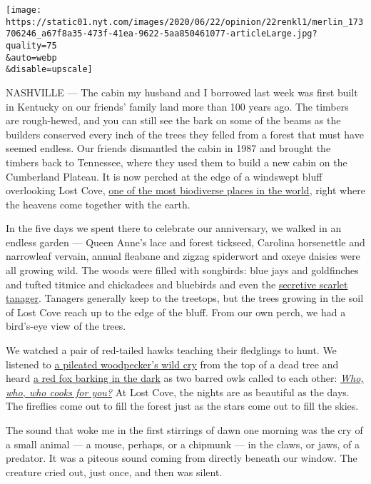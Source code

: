 \texttt{[image: https://static01.nyt.com/images/2020/06/22/opinion/22renkl1/merlin\_173706246\_a67f8a35-473f-41ea-9622-5aa850461077-articleLarge.jpg?quality=75\\\&auto=webp\\\&disable=upscale]}

NASHVILLE --- The cabin my husband and I borrowed last week was first
built in Kentucky on our friends' family land more than 100 years ago.
The timbers are rough-hewed, and you can still see the bark on some of
the beams as the builders conserved every inch of the trees they felled
from a forest that must have seemed endless. Our friends dismantled the
cabin in 1987 and brought the timbers back to Tennessee, where they used
them to build a new cabin on the Cumberland Plateau. It is now perched
at the edge of a windswept bluff overlooking Lost Cove,
\href{https://www.landtrusttn.org/projects/lost-cove-sewanee-tn/}{one of
the most biodiverse places in the world}, right where the heavens come
together with the earth.

In the five days we spent there to celebrate our anniversary, we walked
in an endless garden --- Queen Anne's lace and forest tickseed, Carolina
horsenettle and narrowleaf vervain, annual fleabane and zigzag
spiderwort and oxeye daisies were all growing wild. The woods were
filled with songbirds: blue jays and goldfinches and tufted titmice and
chickadees and bluebirds and even the
\href{https://www.allaboutbirds.org/guide/Scarlet_Tanager/id}{secretive
scarlet tanager}. Tanagers generally keep to the treetops, but the trees
growing in the soil of Lost Cove reach up to the edge of the bluff. From
our own perch, we had a bird's-eye view of the trees.

We watched a pair of red-tailed hawks teaching their fledglings to hunt.
We listened to \href{https://www.youtube.com/watch?v=NqPPioNKIfo}{a
pileated woodpecker's wild cry} from the top of a dead tree and heard
\href{https://wildambience.com/wildlife-sounds/red-fox/}{a red fox
barking in the dark} as two barred owls called to each other:
\href{https://www.youtube.com/watch?v=y5zc-NHIipw}{\emph{Who, who, who
cooks for you?}} At Lost Cove, the nights are as beautiful as the days.
The fireflies come out to fill the forest just as the stars come out to
fill the skies.

The sound that woke me in the first stirrings of dawn one morning was
the cry of a small animal --- a mouse, perhaps, or a chipmunk --- in the
claws, or jaws, of a predator. It was a piteous sound coming from
directly beneath our window. The creature cried out, just once, and then
was silent.

